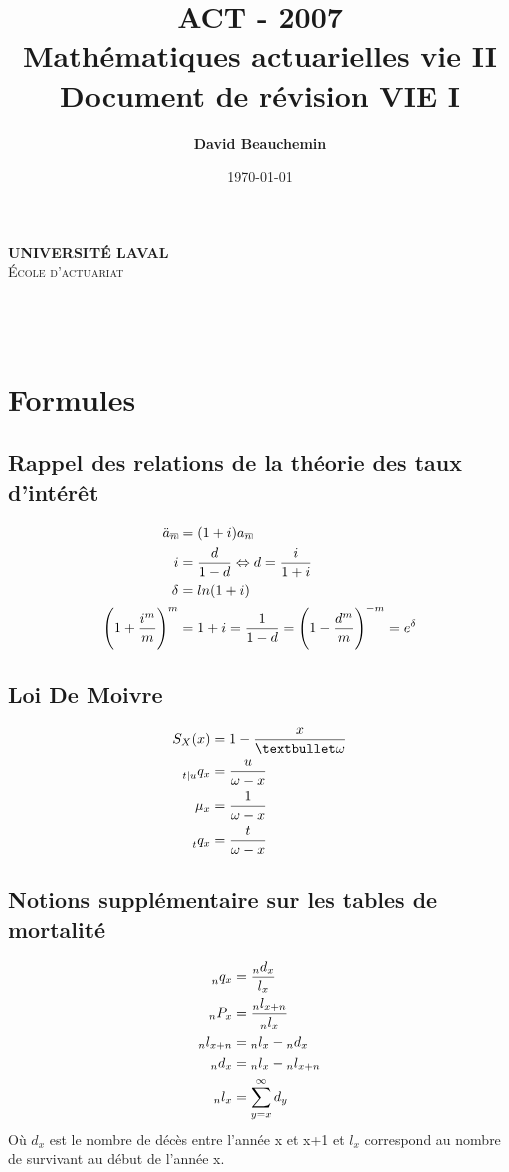 \documentclass[11pt,french]{report}
\title{ACT - 2007 \\ Mathématiques actuarielles vie II \\ Document de révision VIE I}
\author{\textbf{David Beauchemin}}
\date{\today}
\makeatletter
\DeclareRobustCommand{\annuity}[1]{%
\def\arraystretch{0}%
\setlength\arraycolsep{.7pt}%
\setlength\arrayrulewidth{.3pt}%
\begin{array}[b]{@{}c|}\hline
\\[\arraycolsep]%
\scriptstyle #1%
\end{array}%
}
\newcommand{\indiceGauche}[2]{{\vphantom{#2}}_{#1}#2}
\makeatother
\begin{document}
\makeatletter
  \begin{titlepage}
  \centering
      {\large \textbf{\textsc{UNIVERSITÉ LAVAL}}}\\
      \textsc{École d'actuariat}\\
    \vspace{2cm}
    \vspace{2cm}
      {\LARGE \textbf{\@title}} \\
    \vfill
       {\large \@author} \\
    \vspace{4cm}
        {\large\textbf{\@date}}\\
    \vfill
  \end{titlepage}
\makeatother

\tableofcontents


\chapter{Formules}
\section{Rappel des relations de la théorie des taux d'intérêt}
\begin{align*}
\ddot{a}_{\annuity{n}} &= (1+i)a_{\annuity{n}}\\
i &= \frac{d}{1-d} \Leftrightarrow d = \frac{i}{1+i}\\
\delta &= ln(1+i) \\
\Bigg( 1+ \frac{i^m}{m}\Bigg)^m &= 1+i = \frac{1}{1 - d} = \Bigg( 1 - \frac{d^m}{m}\Bigg)^{-m} = e^{\delta}
\end{align*}
\section{Loi De Moivre}
\begin{align*}
S_X(x) &= 1 - \frac{x}{•\omega} \\
\indiceGauche{t|u}{q}_x &= \frac{u}{\omega - x} \\
\mu_x &= \frac{1}{\omega - x} \\
\indiceGauche{t}{q}_x &= \frac{t}{\omega - x}
\end{align*}
\section{Notions supplémentaire sur les tables de mortalité}
\begin{align*}
\indiceGauche{n}{q}_x &= \frac{\indiceGauche{n}{d}_x}{l_x} \\
\indiceGauche{n}{P}_x &= \frac{\indiceGauche{n}{l}_{x+n}}{\indiceGauche{n}{l}_x} \\
\indiceGauche{n}{l}_{x+n} &= \indiceGauche{n}{l}_{x} - \indiceGauche{n}{d}_{x} \\
\indiceGauche{n}{d}_{x} &= \indiceGauche{n}{l}_{x} - \indiceGauche{n}{l}_{x+n} \\
\indiceGauche{n}{l}_{x} &= \sum_{y=x}^{\infty} d_y
\end{align*}
Où $d_{x}$ est le nombre de décès entre l'année x et x+1 et $l_{x}$ correspond au nombre de survivant au début de l'année x.
\end{document}
